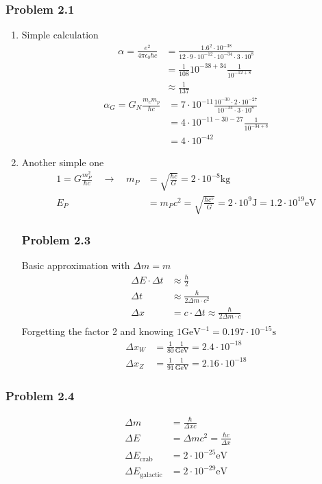 \documentclass[10pt,a4paper]{book}
\theoremstyle{definition}
\begin{document}
\subsubsection{Problem 2.1}
\begin{enumerate}
\item Simple calculation
\begin{align}
\alpha=\frac{e^2}{4\pi\epsilon_0\hbar c}&=\frac{1.6^2\cdot 10^{-38}}{12\cdot 9\cdot 10^{-12}\cdot 10^{-34}\cdot3\cdot10^8}\\
&=\frac{1}{108}10^{-38+34}\frac{1}{10^{-12+8}}\\
&\approx\frac{1}{137}
\end{align}
\begin{align}
\alpha_G=G_N\frac{m_em_p}{\hbar c}&=7\cdot10^{-11}\frac{10^{-30}\cdot2\cdot10^{-27}}{10^{-34}\cdot3\cdot10^8}\\
&=4\cdot10^{-11-30-27}\frac{1}{10^{-34+8}}\\
&=4\cdot10^{-42}
\end{align}
\item Another simple one
\begin{align}
1=G\frac{m_P^2}{\hbar c}\quad\rightarrow\quad m_P&=\sqrt{\frac{\hbar c}{G}}=2\cdot10^{-8}\text{kg}\\
E_P&=m_Pc^2=\sqrt{\frac{\hbar c^5}{G}}=2\cdot10^9\text{J}=1.2\cdot10^{19}\text{eV}
\end{align}

\subsubsection{Problem 2.3}
Basic approximation with $\Delta m = m$
\begin{align}
\Delta E\cdot\Delta t&\approx\frac{\hbar}{2}\\
\Delta t&\approx\frac{\hbar}{2\Delta m\cdot c^2}\\
\Delta x&=c\cdot\Delta t\approx\frac{\hbar}{2\Delta m\cdot c}\\
\end{align}
Forgetting the factor 2 and knowing $1\text{GeV}^{-1}= 0.197\cdot10^{-15}\text{s}$
\begin{align}
\Delta x_W&=\frac{1}{80}\frac{1}{\text{GeV}}=2.4\cdot10^{-18}\\
\Delta x_Z&=\frac{1}{91}\frac{1}{\text{GeV}}=2.16\cdot10^{-18}
\end{align}
\end{enumerate}

\subsubsection{Problem 2.4}
\begin{align}
\Delta m &= \frac{\hbar}{\Delta x c}\\
\Delta E &= \Delta m c^2=\frac{\hbar c}{\Delta x}\\
\Delta E_\text{crab}&=2\cdot10^{-25}\text{eV}\\
\Delta E_\text{galactic}&=2\cdot10^{-29}\text{eV}
\end{align}
\end{document}
